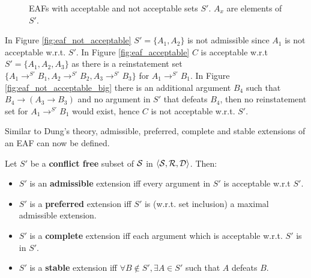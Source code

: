 \begin{figure}[h]
{
		\label{fig:eaf_not_acceptable_big}
	}
	\caption{\glspl{EAF} with acceptable and not acceptable sets $S'$. $A_x$ are elements of $S'$.}
\end{figure}

\begin{exa}
	In Figure \autoref{fig:eaf_not_acceptable} $S'=\{A_1, A_2\}$ is not admissible since $A_1$ is not acceptable w.r.t. $S'$. In Figure \autoref{fig:eaf_acceptable} $C$ is acceptable w.r.t $S' = \{A_1, A_2, A_3\}$ as there is a reinstatement set $\{A_1 \rightarrow^{S'} B_1, A_2 \rightarrow^{S'} B_2, A_3 \rightarrow^{S'} B_3\}$ for $A_1 \rightarrow^{S'} B_1$. In Figure \autoref{fig:eaf_not_acceptable_big} there is an additional argument $B_4$ such that $B_4 \rightarrow (A_3 \rightarrow B_3)$ and no argument in $S'$ that defeats $B_4$, then no reinstatement set for $A_1 \rightarrow^{S'} B_1$ would exist, hence $C$ is not acceptable w.r.t. $S'$.
\end{exa}

Similar to Dung's theory, admissible, preferred, complete and stable extensions of an \gls{EAF} can now be defined.


\begin{definition}
	Let $S'$ be a \textbf{conflict free} subset of $\S$ in $\langle \S, \R, \D \rangle$. Then:
	\begin{itemize}
		\item $S'$ is an \textbf{admissible} extension iff every argument in $S'$ is acceptable w.r.t $S'$.
		\item $S'$ is a \textbf{preferred} extension iff $S'$ is (w.r.t. set inclusion) a maximal admissible extension.
		\item $S'$ is a \textbf{complete} extension iff each argument which is acceptable w.r.t. $S'$ is in $S'$.
		\item $S'$ is a \textbf{stable} extension iff $\forall B \notin S', \exists A \in S'$ such that $A$ defeats $B$.
	\end{itemize}
\end{definition}


